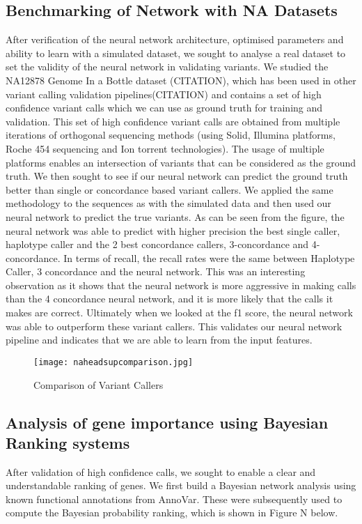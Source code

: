 \documentclass{article}
\begin{document}
\subsection{Benchmarking of Network with NA Datasets}
After verification of the neural network architecture, optimised parameters and ability to learn with a simulated dataset, we sought to analyse a real dataset to set the validity of the neural network in validating variants. We studied the NA12878 Genome In a Bottle dataset (CITATION), which has been used in other variant calling validation pipelines(CITATION) and contains a set of high confidence variant calls which we can use as ground truth for training and validation. This set of high confidence variant calls are obtained from multiple iterations of orthogonal sequencing methods (using Solid, Illumina platforms, Roche 454 sequencing and Ion torrent technologies). The usage of multiple platforms enables an intersection of variants that can be considered as the ground truth. We then sought to see if our neural network can predict the ground truth better than single or concordance based variant callers. We applied the same methodology to the sequences as with the simulated data and then used our neural network to predict the true variants. As can be seen from the figure, the neural network was able to predict with higher precision the best single caller, haplotype caller and the 2 best concordance callers, 3-concordance and 4-concordance. In terms of recall, the recall rates were the same between Haplotype Caller, 3 concordance and the neural network. This was an interesting observation as it shows that the neural network is more aggressive in making calls than the 4 concordance neural network, and it is more likely that the calls it makes are correct. Ultimately when we looked at the f1 score, the neural network was able to outperform these variant callers. This validates our neural network pipeline and indicates that we are able to learn from the input features. 

\begin{figure}[H]
\texttt{[image: naheadsupcomparison.jpg]}
\caption{Comparison of Variant Callers}
\centering
\end{figure}

\subsection{Analysis of gene importance using Bayesian Ranking systems}
After validation of high confidence calls, we sought to enable a clear and understandable ranking of genes. We first build a Bayesian network analysis using known functional annotations from AnnoVar. These were subsequently used to compute the Bayesian probability ranking, which is shown in Figure N below.
\end{document}
